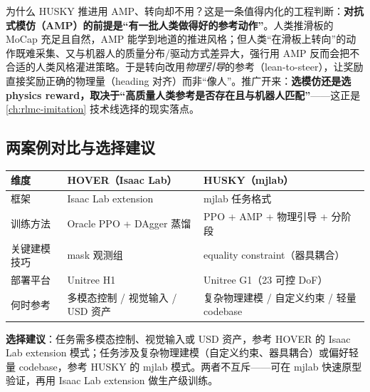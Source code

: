 \begin{insight}\label{ins:rlmc-diy-amp-scope}
为什么 HUSKY 推进用 AMP、转向却不用？这是一条值得内化的工程判断：\textbf{对抗式模仿（AMP）的前提是“有一批人类做得好的参考动作”}。人类推滑板的 MoCap 充足且自然，AMP 能学到地道的推进风格；但人类“在滑板上转向”的动作既难采集、又与机器人的质量分布/驱动方式差异大，强行用 AMP 反而会把不合适的人类风格灌进策略。于是转向改用\emph{物理引导}的参考（lean-to-steer），让奖励直接奖励正确的物理量（heading 对齐）而非“像人”。推广开来：\textbf{选模仿还是选 physics reward，取决于“高质量人类参考是否存在且与机器人匹配”}——这正是 \cref{ch:rlmc-imitation} 技术线选择的现实落点。
\end{insight}

\subsection{两案例对比与选择建议}
\label{sec:rlmc-diy-cases-compare}

\begin{center}
\small
\begin{tabular}{@{}lp{4.6cm}p{4.6cm}@{}}
\toprule
维度 & HOVER（Isaac Lab） & HUSKY（mjlab） \\
\midrule
框架 & Isaac Lab extension & mjlab 任务格式 \\
训练方法 & Oracle PPO + DAgger 蒸馏 & PPO + AMP + 物理引导 + 分阶段 \\
关键建模技巧 & mask 观测组 & equality constraint（器具耦合） \\
部署平台 & Unitree H1 & Unitree G1（23 可控 DoF） \\
何时参考 & 多模态控制 / 视觉输入 / USD 资产 & 复杂物理建模 / 自定义约束 / 轻量 codebase \\
\bottomrule
\end{tabular}
\end{center}

\textbf{选择建议}：任务需多模态控制、视觉输入或 USD 资产，参考 HOVER 的 Isaac Lab extension 模式；任务涉及复杂物理建模（自定义约束、器具耦合）或偏好轻量 codebase，参考 HUSKY 的 mjlab 模式。两者不互斥——可在 mjlab 快速原型验证，再用 Isaac Lab extension 做生产级训练。

